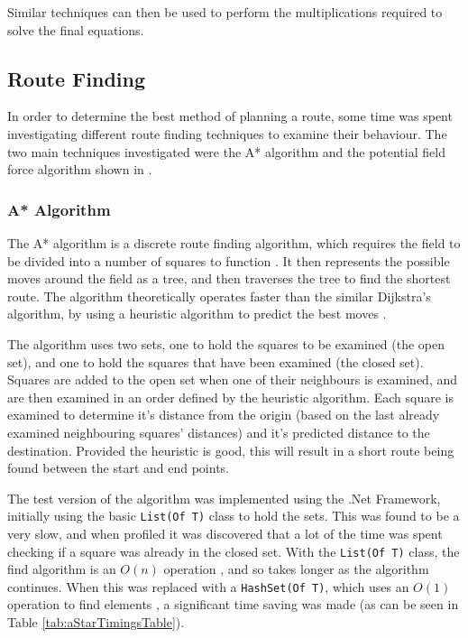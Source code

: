 \documentclass[10pt]{article}
\begin{document}
Similar techniques can then be used to perform the multiplications required to
solve the final equations.

\subsection{Route Finding}
In order to determine the best method of planning a route, some time was spent
investigating different route finding techniques to examine their behaviour. 
The two main techniques investigated were the A* algorithm and the potential
field force algorithm shown in \cite{intelligentAlgorithmPathPlanning}.

\subsubsection{A* Algorithm}

The A* algorithm is a discrete route finding algorithm, which requires the field
to be divided into a number of squares to function \cite{aiModernApproach}.  It
then represents the possible moves around the field as a tree, and then
traverses the tree to find the shortest route.  The algorithm theoretically
operates faster than the similar Dijkstra's algorithm, by using a heuristic
algorithm to predict the best moves \cite{wikipediaAStar}.

The algorithm uses two sets, one to hold the squares to be examined (the open
set), and one to hold the squares that have been examined (the closed set).
Squares are added to the open set when one of their neighbours is examined, and
are then examined in an order defined by the heuristic algorithm.  Each square
is examined to determine it's distance from the origin (based on the last
already examined neighbouring squares' distances) and it's predicted distance to
the destination. Provided the heuristic is good, this will result in a short
route being found between the start and end points.

The test version of the algorithm was implemented using the .Net Framework,
initially using the basic \texttt{List(Of T)} class to hold the sets.  This was
found to be a very slow, and when profiled it was discovered that a lot of the
time was spent checking if a square was already in the closed set.  With the
\texttt{List(Of T)} class, the find algorithm is an $O(n)$ operation
\cite{msdnListOfT}, and so takes longer as the algorithm continues.  When this
was replaced with a \texttt{HashSet(Of T)}, which uses an $O(1)$ operation to
find elements \cite{msdnHashSetOfT}, a significant time saving was made (as can
be seen in Table \ref{tab:aStarTimingsTable}).
\end{document}
